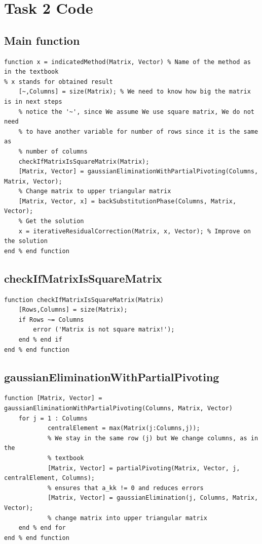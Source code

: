 \section{Task 2 Code}
\subsection{Main function}
\begin{simplechar}
\begin{lstlisting}
function x = indicatedMethod(Matrix, Vector) % Name of the method as in the textbook
% x stands for obtained result
    [~,Columns] = size(Matrix); % We need to know how big the matrix is in next steps
    % notice the '~', since We assume We use square matrix, We do not need
    % to have another variable for number of rows since it is the same as
    % number of columns
    checkIfMatrixIsSquareMatrix(Matrix);
    [Matrix, Vector] = gaussianEliminationWithPartialPivoting(Columns, Matrix, Vector);
    % Change matrix to upper triangular matrix
    [Matrix, Vector, x] = backSubstitutionPhase(Columns, Matrix, Vector);
    % Get the solution
    x = iterativeResidualCorrection(Matrix, x, Vector); % Improve on the solution
end % end function
\end{lstlisting}
\end{simplechar}

\subsection{checkIfMatrixIsSquareMatrix}
\begin{simplechar}
\begin{lstlisting}
function checkIfMatrixIsSquareMatrix(Matrix)
    [Rows,Columns] = size(Matrix);
    if Rows ~= Columns
        error ('Matrix is not square matrix!');
    end % end if
end % end function
\end{lstlisting}
\end{simplechar}

\newpage
\subsection{gaussianEliminationWithPartialPivoting}
\begin{simplechar}
\begin{lstlisting}
function [Matrix, Vector] = gaussianEliminationWithPartialPivoting(Columns, Matrix, Vector)
    for j = 1 : Columns
            centralElement = max(Matrix(j:Columns,j));
            % We stay in the same row (j) but We change columns, as in the
            % textbook
            [Matrix, Vector] = partialPivoting(Matrix, Vector, j, centralElement, Columns);
            % ensures that a_kk != 0 and reduces errors
            [Matrix, Vector] = gaussianElimination(j, Columns, Matrix, Vector);
            % change matrix into upper triangular matrix
    end % end for
end % end function
\end{lstlisting}
\end{simplechar}

